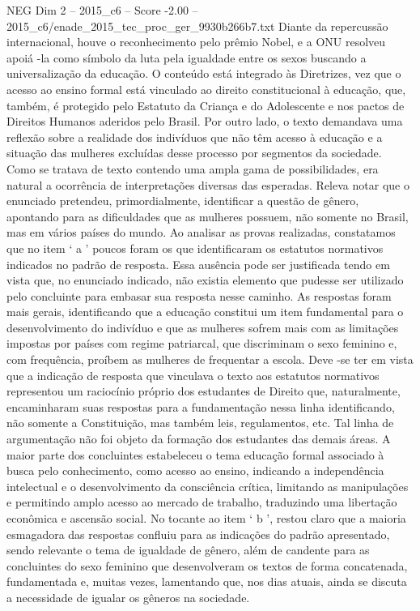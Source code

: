 \begin{textsample}{NEG Dim 2 – 2015\_c6 – Score -2.00 – 2015\_c6/enade\_2015\_tec\_proc\_ger\_9930b266b7.txt}
Diante da repercussão internacional, houve o reconhecimento pelo prêmio Nobel, e a ONU resolveu apoiá -la como símbolo da luta pela igualdade entre os sexos buscando a universalização da educação.
O conteúdo está integrado às Diretrizes, vez que o acesso ao ensino formal está vinculado ao direito constitucional à educação, que, também, é protegido pelo Estatuto da Criança e do Adolescente e nos pactos de Direitos Humanos aderidos pelo Brasil.
Por outro lado, o texto demandava uma reflexão sobre a realidade dos indivíduos que não têm acesso à educação e a situação das mulheres excluídas desse processo por segmentos da sociedade.
Como se tratava de texto contendo uma ampla gama de possibilidades, era natural a ocorrência de interpretações diversas das esperadas.
Releva notar que o enunciado pretendeu, primordialmente, identificar a questão de gênero, apontando para as dificuldades que as mulheres possuem, não somente no Brasil, mas em vários países do mundo.
Ao analisar as provas realizadas, constatamos que no item ‘ a ’ poucos foram os que identificaram os estatutos normativos indicados no padrão de resposta.
Essa ausência pode ser justificada tendo em vista que, no enunciado indicado, não existia elemento que pudesse ser utilizado pelo concluinte para embasar sua resposta nesse caminho.
As respostas foram mais gerais, identificando que a educação constitui um item fundamental para o desenvolvimento do indivíduo e que as mulheres sofrem mais com as limitações impostas por países com regime patriarcal, que discriminam o sexo feminino e, com frequência, proíbem as mulheres de frequentar a escola.
Deve -se ter em vista que a indicação de resposta que vinculava o texto aos estatutos normativos representou um raciocínio próprio dos estudantes de Direito que, naturalmente, encaminharam suas respostas para a fundamentação nessa linha identificando, não somente a Constituição, mas também leis, regulamentos, etc.
Tal linha de argumentação não foi objeto da formação dos estudantes das demais áreas.
A maior parte dos concluintes estabeleceu o tema educação formal associado à busca pelo conhecimento, como acesso ao ensino, indicando a independência intelectual e o desenvolvimento da consciência crítica, limitando as manipulações e permitindo amplo acesso ao mercado de trabalho, traduzindo uma libertação econômica e ascensão social.
No tocante ao item ‘ b ’, restou claro que a maioria esmagadora das respostas confluiu para as indicações do padrão apresentado, sendo relevante o tema de igualdade de gênero, além de candente para as concluintes do sexo feminino que desenvolveram os textos de forma concatenada, fundamentada e, muitas vezes, lamentando que, nos dias atuais, ainda se discuta a necessidade de igualar os gêneros na sociedade.

\end{textsample}
